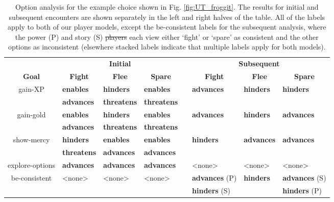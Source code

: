 \documentclass[arts,article,submit,moreauthors,pdftex,10pt,a4paper]{Definitions/mdpi}
\newcommand{\enables}{\textbf{\color{enables}enables}}
\newcommand{\advances}{\textbf{\color{advances}advances}}
\newcommand{\threatens}{\textbf{\color{threatens}threatens}}
\newcommand{\hinders}{\textbf{\color{hinders}hinders}}
\providecommand{\DIFadd}[1]{{\protect\color{blue}\uwave{#1}}} %
\providecommand{\DIFdel}[1]{{\protect\color{red}\sout{#1}}}                      %
\providecommand{\DIFaddFL}[1]{\DIFadd{#1}} %
\providecommand{\DIFdelFL}[1]{\DIFdel{#1}} %
\providecommand{\DIFaddbeginFL}{} %
\providecommand{\DIFaddendFL}{} %
\providecommand{\DIFdelbeginFL}{} %
\providecommand{\DIFdelendFL}{} %
\begin{document}
\begin{table}[H]
\centering
\begin{tabular}{c l l l c l l l}
  \toprule
  & \multicolumn{3}{c}{\textbf{Initial}} && \multicolumn{3}{c}{\textbf{Subsequent}} \\
  \cmidrule(r){1-1} \cmidrule{2-4} \cmidrule{6-8}
  \textbf{Goal} & \multicolumn{1}{c}{\textbf{Fight}} & \multicolumn{1}{c}{\textbf{Flee}} & \multicolumn{1}{c}{\textbf{Spare}} && \multicolumn{1}{c}{\textbf{Fight}} & \multicolumn{1}{c}{\textbf{Flee}} & \multicolumn{1}{c}{\textbf{Spare}} \\
  \cmidrule(r){1-1} \cmidrule{2-4} \cmidrule{6-8}
  \multirow{2}{7em}{\centering gain-XP} & \enables{} & \hinders{} & \enables{} && \multirow{2}{4.5em}{\advances{}} & \multirow{2}{4.5em}{\hinders{}} & \multirow{2}{4.5em}{\hinders{}} \\
                                        & \advances{} & \threatens{} & \threatens{} && & & \\
  \cmidrule(r){1-1} \cmidrule{2-4} \cmidrule{6-8}
  \multirow{2}{7em}{\centering gain-gold} & \enables{} & \hinders{} & \enables{} && \multirow{2}{4.5em}{\advances{}} & \multirow{2}{4.5em}{\hinders{}} & \multirow{2}{4.5em}{\advances{}} \\
                                          & \advances{} & \threatens{} & \threatens{} && & & \\
  \cmidrule(r){1-1} \cmidrule{2-4} \cmidrule{6-8}
  \multirow{2}{7em}{\centering show-mercy} & \hinders{} & \enables{} & \enables{} && \multirow{2}{4.5em}{\hinders{}} & \multirow{2}{4.5em}{\advances{}} & \multirow{2}{4.5em}{\advances{}} \\
                                          & \threatens{} & \advances{} & \advances{} \\
  \cmidrule(r){1-1} \cmidrule{2-4} \cmidrule{6-8}
  explore-options & \advances{} & \advances{} & \advances{} && <none> & <none> & <none> \\
  \cmidrule(r){1-1} \cmidrule{2-4} \cmidrule{6-8}
  \multirow{2}{7em}{\centering be-consistent} & \multirow{2}{4.5em}{<none>} & \multirow{2}{4.5em}{<none>} & \multirow{2}{4.5em}{<none>} && \advances{} (P) & \multirow{2}{4.5em}{\hinders{}} & \advances{} (S) \\
  & & & && \hinders{} (S) & & \hinders{} (P) \\
  \bottomrule
\end{tabular}
  \caption[\emph{Undertale}option analysis]{Option analysis for the example choice shown in Fig. \ref{fig:UT_froggit}. The results for initial and subsequent encounters are shown separately in the left and right halves of the table. All of the labels apply to both of our player models, except the be-consistent labels for the subsequent analysis, where the power (P) and story (S) \DIFdelbeginFL \DIFdelFL{players }\DIFdelendFL \DIFaddbeginFL \DIFaddFL{player models }\DIFaddendFL each view either `fight' or `spare' as consistent and the other options as inconsistent (elsewhere stacked labels indicate that multiple labels apply for both models).}
\label{tab:UT_options}
\end{table}
\end{document}
